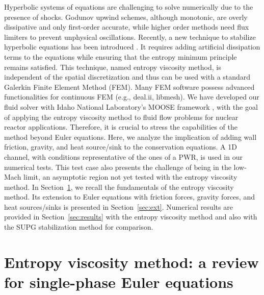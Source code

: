 \documentclass[12pt]{article}
\begin{document}
Hyperbolic systems of equations are challenging to solve numerically due to the presence of shocks. Godunov upwind schemes, although monotonic,  are overly
dissipative and only first-order accurate, while higher order methods need flux  limiters to prevent unphysical oscillations. Recently,
a new technique to stabilize hyperbolic equations has been introduced \cite{valentin, jlg1, jlg2} . 
It requires adding artificial dissipation terms to the equations while ensuring that the entropy minimum principle remains satisfied. 
This technique, named entropy viscosity method, is independent of the spatial discretization and thus can be used with a standard 
Galerkin Finite Element Method (FEM). Many FEM software possess advanced functionalities for continuous FEM (e.g., deal.ii, libmesh).
We have developed our fluid solver with Idaho National Laboratory's MOOSE framework \cite{Moose}, with the goal of applying the entropy 
viscosity method to fluid flow problems for nuclear reactor applications. Therefore, it is crucial to stress the capabilities of the method
beyond Euler equations. Here, we analyze the implication of adding wall friction, gravity, and heat source/sink to the conservation equations.
A 1D channel, with conditions representative of the ones of a PWR, is used in our numerical tests. This test case also presents the challenge
of being in the low-Mach limit, an asymptotic region not yet tested with the entropy viscosity method. In Section~\ref{sec:section1}, we recall
the fundamentals of the entropy viscosity method.  Its extension to Euler equations with friction forces, gravity forces, and heat sources/sinks is presented in Section~\ref{sec:ext}. Numerical results are provided in Section~\ref{sec:results} with the entropy viscosity method and also with the SUPG stabilization method  \cite{SUPG} for comparison.


%
\section{Entropy viscosity method: a review for single-phase Euler equations}
\label{sec:section1}
\end{document}

